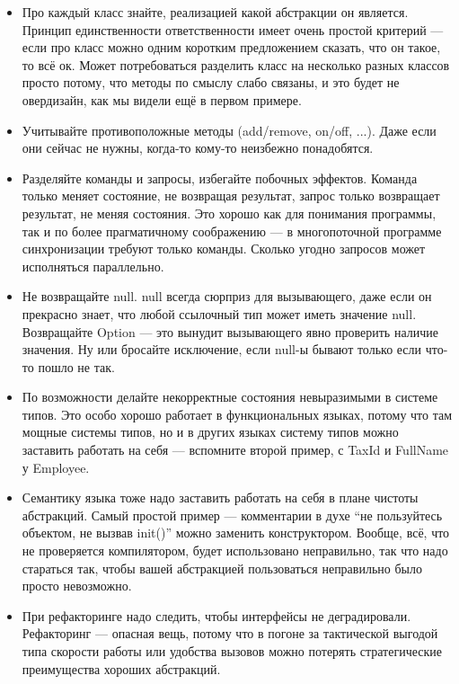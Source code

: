 \documentclass{../../text-style}
\begin{document}
\begin{itemize}
	\item Про каждый класс знайте, реализацией какой абстракции он является. Принцип единственности ответственности имеет очень простой критерий --- если про класс можно одним коротким предложением сказать, что он такое, то всё ок. Может потребоваться разделить класс на несколько разных классов просто потому, что методы по смыслу слабо связаны, и это будет не овердизайн, как мы видели ещё в первом примере.
	\item Учитывайте противоположные методы (add/remove, on/off, ...). Даже если они сейчас не нужны, когда-то кому-то неизбежно понадобятся.
	\item Разделяйте команды и запросы, избегайте побочных эффектов. Команда только меняет состояние, не возвращая результат, запрос только возвращает результат, не меняя состояния. Это хорошо как для понимания программы, так и по более прагматичному соображению --- в многопоточной программе синхронизации требуют только команды. Сколько угодно запросов может исполняться параллельно.
	\item Не возвращайте null. null всегда сюрприз для вызывающего, даже если он прекрасно знает, что любой ссылочный тип может иметь значение null. Возвращайте Option --- это вынудит вызывающего явно проверить наличие значения. Ну или бросайте исключение, если null-ы бывают только если что-то пошло не так.
	\item По возможности делайте некорректные состояния невыразимыми в системе типов. Это особо хорошо работает в функциональных языках, потому что там мощные системы типов, но и в других языках систему типов можно заставить работать на себя --- вспомните второй пример, с TaxId и FullName у Employee.
	\item Семантику языка тоже надо заставить работать на себя в плане чистоты абстракций. Самый простой пример --- комментарии в духе ``не пользуйтесь объектом, не вызвав  init()'' можно заменить конструктором. Вообще, всё, что не проверяется компилятором, будет использовано неправильно, так что надо стараться так, чтобы вашей абстракцией пользоваться неправильно было просто невозможно.
	\item При рефакторинге надо следить, чтобы интерфейсы не деградировали. Рефакторинг --- опасная вещь, потому что в погоне за тактической выгодой типа скорости работы или удобства вызовов можно потерять стратегические преимущества хороших абстракций.
\end{itemize}
\end{document}
